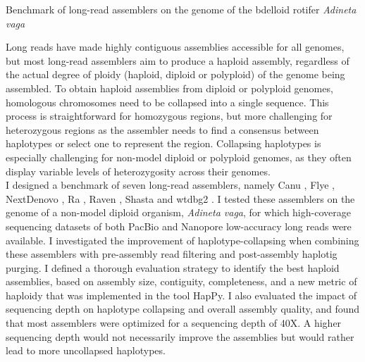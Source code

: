 \newenvironment{suppsection}{
\newcommand{\beginsupplement}{%
        \setcounter{table}{0}
        \renewcommand{\thetable}{S\arabic{table}}%
        \setcounter{figure}{0}
        \renewcommand{\thefigure}{S\arabic{figure}}%
     }
}

\chapter{Benchmark of long-read assemblers on the genome of the bdelloid rotifer \textit{Adineta vaga}}

Long reads have made highly contiguous assemblies accessible for all genomes, but most long-read assemblers aim to produce a haploid assembly, regardless of the actual degree of ploidy (haploid, diploid or polyploid) of the genome being assembled. To obtain haploid assemblies from diploid or polyploid genomes, homologous chromosomes need to be collapsed into a single sequence. This process is straightforward for homozygous regions, but more challenging for heterozygous regions as the assembler needs to find a consensus between haplotypes or select one to represent the region. Collapsing haplotypes is especially challenging for non-model diploid or polyploid genomes, as they often display variable levels of heterozygosity across their genomes. \\

I designed a benchmark of seven long-read assemblers, namely Canu \cite{canu}, Flye \cite{flye}, NextDenovo \cite{nextdenovo}, Ra \cite{ra}, Raven \cite{raven}, Shasta \cite{shasta} and wtdbg2 \cite{wtdbg2}. I tested these assemblers on the genome of a non-model diploid organism, \textit{Adineta vaga}, for which high-coverage sequencing datasets of both PacBio and Nanopore low-accuracy long reads were available. I investigated the improvement of haplotype-collapsing when combining these assemblers with pre-assembly read filtering and post-assembly haplotig purging. I defined a thorough evaluation strategy to identify the best haploid assemblies, based on assembly size, contiguity, completeness, and a new metric of haploidy that was implemented in the tool HapPy. I also evaluated the impact of sequencing depth on haplotype collapsing and overall assembly quality, and found that most assemblers were optimized for a sequencing depth of 40X. A higher sequencing depth would not necessarily improve the assemblies but would rather lead to more uncollapsed haplotypes. \\

